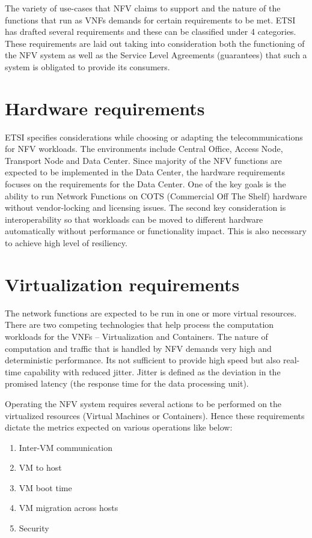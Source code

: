 \documentclass[../seminar.tex]{subfiles}
\begin{document}
	
The variety of use-cases that NFV claims to support and the nature of the functions that run as VNFs demands for certain requirements to be met. ETSI has drafted several requirements and these can be classified under 4 categories. These requirements are laid out taking into consideration both the functioning of the NFV system as well as the Service Level Agreements (guarantees) that such a system is obligated to provide its consumers.
	
\section{Hardware requirements}

ETSI specifies considerations while choosing or adapting the telecommunications for NFV workloads. The environments include Central Office, Access Node, Transport Node and Data Center. Since majority of the NFV functions are expected to be implemented in the Data Center, the hardware requirements focuses on the requirements for the Data Center. One of the key goals is the ability to run Network Functions on COTS (Commercial Off The Shelf) hardware without vendor-locking and licensing issues. The second key consideration is interoperability so that workloads can be moved to different hardware automatically without performance or functionality impact. This is also necessary to achieve high level of resiliency. 

	
\section{Virtualization requirements}
	
The network functions are expected to be run in one or more virtual resources. There are two competing technologies that help process the computation workloads for the VNFs – Virtualization and Containers. The nature of computation and traffic that is handled by NFV demands very high and deterministic performance. Its not sufficient to provide high speed but also real-time capability with reduced jitter. Jitter is defined as the deviation in the promised latency (the response time for the data processing unit).  
	
Operating the NFV system requires several actions to be performed on the virtualized resources (Virtual Machines or Containers). Hence these requirements dictate the metrics expected on various operations like below:


\begin{enumerate}
    \item Inter-VM communication
    \item VM to host 
    \item VM boot time
    \item VM migration across hosts
    \item Security
\end{enumerate}
\end{document}
